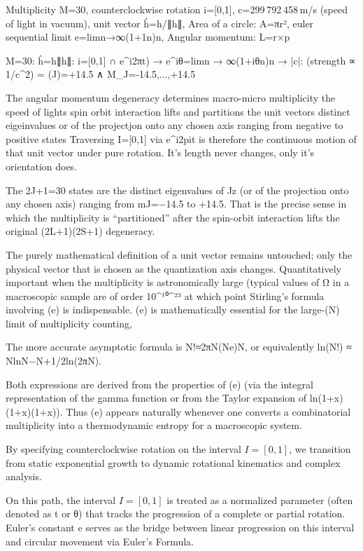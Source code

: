 Multiplicity M=30, counterclockwise rotation i=[0,1], c=299 792 458 m/s (speed of light in vacuum), unit vector ĥ=h/∥h∥, Area of a circle: A=πr², euler sequential limit e=lim⁡n→∞(1+1n)n, Angular momentum: L=r×p

M=30: ĥ=h∥h∥: i=[0,1] ∩ e^{i2πt)} → e^iθ=lim⁡n → ∞(1+iθn)n → |c|: (strength ∝ 1/c^2) = (J)=+14.5 ∧ M_J=-14.5,...,+14.5

The angular momentum degeneracy determines macro-micro multiplicity the speed of lights spin orbit interaction lifts and partitions the unit vectors distinct eigeinvalues or of the projectjon onto any chosen axis ranging from negative to positive states Traversing I=[0,1] via e^{i2pit} is therefore the continuous motion of that unit vector under pure rotation. It's length never changes, only it's orientation does.

The 2J+1=30 states are the distinct eigenvalues of Jz (or of the projection onto any chosen axis) ranging from mJ=−14.5 to +14.5. That is the precise sense in which the multiplicity is “partitioned” after the spin-orbit interaction lifts the original (2L+1)(2S+1) degeneracy. 

The purely mathematical definition of a unit vector remains untouched; only the physical vector that is chosen as the quantization axis changes. Quantitatively important when the multiplicity is astronomically large (typical values of Ω in a macroscopic sample are of order 10^¹⁰^²³ at which point Stirling’s formula involving (e) is indispensable. (e) is mathematically essential for the large-(N) limit of multiplicity counting,

The more accurate asymptotic formula is N!≈2πN(Ne)N, or equivalently ln⁡(N!) ≈ Nln⁡N−N+1/2ln⁡(2πN).

Both expressions are derived from the properties of (e) (via the integral representation of the gamma function or from the Taylor expansion of ln⁡(1+x)\ln(1+x)\ln(1+x)). Thus (e) appears naturally whenever one converts a combinatorial multiplicity into a thermodynamic entropy for a macroscopic system.

By specifying counterclockwise rotation on the interval $I=[0,1]$, we transition from static exponential growth to dynamic rotational kinematics and complex analysis.

On this path, the interval $I=[0,1]$ is treated as a normalized parameter (often denoted as t or θ) that tracks the progression of a complete or partial rotation. Euler’s constant e serves as the bridge between linear progression on this interval and circular movement via Euler's Formula.


